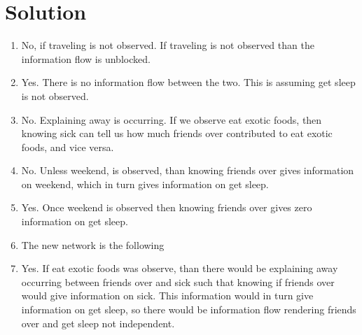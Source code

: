 \documentclass[submit]{harvardml}
\newcommand{\attr}[1]{\textsf{#1}}
\begin{document}
\newpage
\section*{Solution}
\begin{enumerate}
  \item 
  No, if traveling is not observed. If traveling is not observed than the information flow is unblocked.
  
  \item 
  Yes. There is no information flow between the two. This is assuming get sleep is not observed.
  
  \item 
  No. Explaining away is occurring. If we observe eat exotic foods, then knowing sick can tell us how much friends over contributed to eat exotic foods, and vice versa.
  
  \item 
  No. Unless weekend, is observed, than knowing friends over gives information on weekend, which in turn gives information on get sleep.
  
  \item 
  Yes. Once weekend is observed then knowing friends over gives zero information on get sleep.
  
  \item The new network is the following
  \begin{center}
  \end{center}
  
  \item 
  Yes. If eat exotic foods was observe, than there would be explaining away occurring between friends over and sick such that knowing if friends over would give information on sick. This information would in turn give information on get sleep, so there would be information flow rendering friends over and get sleep not independent.
\end{enumerate}
\end{document}
